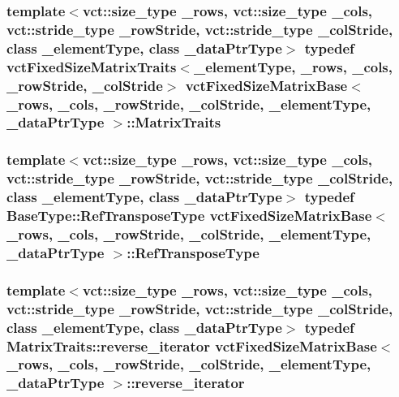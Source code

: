 \subsubsection[{Matrix\+Traits}]{\setlength{\rightskip}{0pt plus 5cm}template$<$vct\+::size\+\_\+type \+\_\+rows, vct\+::size\+\_\+type \+\_\+cols, vct\+::stride\+\_\+type \+\_\+row\+Stride, vct\+::stride\+\_\+type \+\_\+col\+Stride, class \+\_\+element\+Type, class \+\_\+data\+Ptr\+Type$>$ typedef {\bf vct\+Fixed\+Size\+Matrix\+Traits}$<$\+\_\+element\+Type, \+\_\+rows, \+\_\+cols, \+\_\+row\+Stride, \+\_\+col\+Stride$>$ {\bf vct\+Fixed\+Size\+Matrix\+Base}$<$ \+\_\+rows, \+\_\+cols, \+\_\+row\+Stride, \+\_\+col\+Stride, \+\_\+element\+Type, \+\_\+data\+Ptr\+Type $>$\+::{\bf Matrix\+Traits}}\label{classvct_fixed_size_matrix_base_a6691e8d4aab2e2d733c494357ffd870a}
\hypertarget{classvct_fixed_size_matrix_base_aaddf4b1c77971ed669535edb04d02628}{}
\subsubsection[{Ref\+Transpose\+Type}]{\setlength{\rightskip}{0pt plus 5cm}template$<$vct\+::size\+\_\+type \+\_\+rows, vct\+::size\+\_\+type \+\_\+cols, vct\+::stride\+\_\+type \+\_\+row\+Stride, vct\+::stride\+\_\+type \+\_\+col\+Stride, class \+\_\+element\+Type, class \+\_\+data\+Ptr\+Type$>$ typedef {\bf Base\+Type\+::\+Ref\+Transpose\+Type} {\bf vct\+Fixed\+Size\+Matrix\+Base}$<$ \+\_\+rows, \+\_\+cols, \+\_\+row\+Stride, \+\_\+col\+Stride, \+\_\+element\+Type, \+\_\+data\+Ptr\+Type $>$\+::{\bf Ref\+Transpose\+Type}}\label{classvct_fixed_size_matrix_base_aaddf4b1c77971ed669535edb04d02628}
\hypertarget{classvct_fixed_size_matrix_base_aa437178891b922bbc199cd059d2a79fe}{}
\subsubsection[{reverse\+\_\+iterator}]{\setlength{\rightskip}{0pt plus 5cm}template$<$vct\+::size\+\_\+type \+\_\+rows, vct\+::size\+\_\+type \+\_\+cols, vct\+::stride\+\_\+type \+\_\+row\+Stride, vct\+::stride\+\_\+type \+\_\+col\+Stride, class \+\_\+element\+Type, class \+\_\+data\+Ptr\+Type$>$ typedef {\bf Matrix\+Traits\+::reverse\+\_\+iterator} {\bf vct\+Fixed\+Size\+Matrix\+Base}$<$ \+\_\+rows, \+\_\+cols, \+\_\+row\+Stride, \+\_\+col\+Stride, \+\_\+element\+Type, \+\_\+data\+Ptr\+Type $>$\+::{\bf reverse\+\_\+iterator}}\label{classvct_fixed_size_matrix_base_aa437178891b922bbc199cd059d2a79fe}
\hypertarget{classvct_fixed_size_matrix_base_a99d07082e6588c81902cf19226ebf93b}{}
